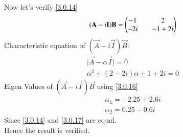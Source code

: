\documentclass[journal,12pt,twocolumn]{IEEEtran}
\begin{document}
 Now let's verify \eqref{3.0.14}
 \begin{equation}\label{3.0.15}
 (\mathbf{A}-i\mathbf{I})\mathbf{B} = \begin{pmatrix}-1 && 2 \\ -2i && -1+2i\end{pmatrix}
 \end{equation}
 Characteristic equation of $(\vec{A}-i\vec{I})\vec{B}$:
 \begin{equation}\label{3.0.16}
 \begin{split}
 \vert\vec{A}-\alpha\vec{I}\vert = 0\\
 \alpha^2 + (2-2i)\alpha + 1 + 2i = 0
 \end{split}
 \end{equation}
 Eigen Values of $(\vec{A}-i\vec{I})\vec{B}$ using \eqref{3.0.16}  
 \begin{equation}\label{3.0.17}
 \begin{split}
 \alpha_1 = -2.25 + 2.6i\\
 \alpha_2 = 0.25 - 0.6i
 \end{split}
 \end{equation}
 Since \eqref{3.0.14} and \eqref{3.0.17} are equal.\\
 Hence the result is verified.
\end{document}
